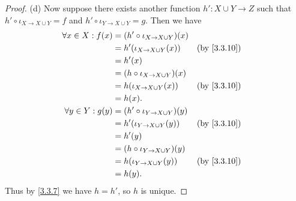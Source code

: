 \begin{proof}{(d)}
  Now suppose there exists another function \(h' : X \cup Y \to Z\) such that \(h' \circ \iota_{X \to X \cup Y} = f\) and \(h' \circ \iota_{Y \to X \cup Y} = g\).
  Then we have
  \begin{align*}
    \forall x \in X : f(x) & = (h' \circ \iota_{X \to X \cup Y})(x)                                \\
                           & = h'(\iota_{X \to X \cup Y}(x))        &  & \text{(by \cref{3.3.10})} \\
                           & = h'(x)                                                               \\
                           & = (h \circ \iota_{X \to X \cup Y})(x)                                 \\
                           & = h(\iota_{X \to X \cup Y}(x))         &  & \text{(by \cref{3.3.10})} \\
                           & = h(x).                                                               \\
    \forall y \in Y : g(y) & = (h' \circ \iota_{Y \to X \cup Y})(y)                                \\
                           & = h'(\iota_{Y \to X \cup Y}(y))        &  & \text{(by \cref{3.3.10})} \\
                           & = h'(y)                                                               \\
                           & = (h \circ \iota_{Y \to X \cup Y})(y)                                 \\
                           & = h(\iota_{Y \to X \cup Y}(y))         &  & \text{(by \cref{3.3.10})} \\
                           & = h(y).
  \end{align*}
  Thus by \cref{3.3.7} we have \(h = h'\), so \(h\) is unique.
\end{proof}